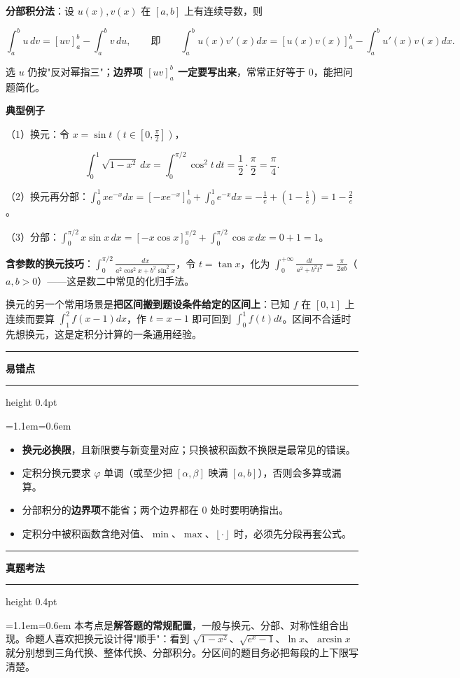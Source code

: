 \documentclass[11pt,openany,UTF8]{ctexbook}
\newcommand{\callouthead}[2]{%
  \par\addvspace{7pt}\noindent
  {\color{#1}\rule[-0.15em]{3pt}{1.05em}}\hspace{0.5em}%
  {\bfseries\color{#1}#2}\par\nobreak\vspace{-0.35em}%
  {\color{rulesep}\hrule height 0.4pt}\nobreak\vspace{0.45em}%
  \begingroup\small\setlength{\parindent}{0pt}%
  \leftskip=1.1em\rightskip=0.6em\noindent\ignorespaces}
\newcommand{\calloutend}{\par\endgroup\addvspace{7pt}}
\newenvironment{callwarn}[1]{\callouthead{warnbar}{#1}}{\calloutend}
\newenvironment{callexam}[1]{\callouthead{exambar}{#1}}{\calloutend}
\begin{document}
\textbf{分部积分法}：设 $u(x),v(x)$ 在 $[a,b]$ 上有连续导数，则

\[\int_a^bu\,dv=\left[uv\right]_a^b-\int_a^bv\,du,\qquad\text{即}\qquad\int_a^bu(x)v'(x)dx=\left[u(x)v(x)\right]_a^b-\int_a^bu'(x)v(x)dx.\]

选 $u$ 仍按"反对幂指三"；\textbf{边界项 $\left[uv\right]_a^b$ 一定要写出来}，常常正好等于 $0$，能把问题简化。

\textbf{典型例子}

（1）换元：令 $x=\sin t\ (t\in[0,\frac{\pi}{2}])$，

\[\int_0^1\sqrt{1-x^2}\,dx=\int_0^{\pi/2}\cos^2t\,dt=\frac{1}{2}\cdot\frac{\pi}{2}=\frac{\pi}{4}.\]

（2）换元再分部：$\displaystyle\int_0^1xe^{-x}dx=\left[-xe^{-x}\right]_0^1+\int_0^1e^{-x}dx=-\frac{1}{e}+\left(1-\frac{1}{e}\right)=1-\frac{2}{e}$。

（3）分部：$\displaystyle\int_0^{\pi/2}x\sin x\,dx=\left[-x\cos x\right]_0^{\pi/2}+\int_0^{\pi/2}\cos x\,dx=0+1=1$。

\textbf{含参数的换元技巧}：$\displaystyle\int_0^{\pi/2}\frac{dx}{a^2\cos^2x+b^2\sin^2x}$，令 $t=\tan x$，化为 $\displaystyle\int_0^{+\infty}\frac{dt}{a^2+b^2t^2}=\frac{\pi}{2ab}$（$a,b>0$）——这是数二中常见的化归手法。

换元的另一个常用场景是\textbf{把区间搬到题设条件给定的区间上}：已知 $f$ 在 $[0,1]$ 上连续而要算 $\int_1^2f(x-1)dx$，作 $t=x-1$ 即可回到 $\int_0^1f(t)dt$。区间不合适时先想换元，这是定积分计算的一条通用经验。

\begin{callwarn}{易错点}
\begin{itemize}
\item \textbf{换元必换限}，且新限要与新变量对应；只换被积函数不换限是最常见的错误。
\item 定积分换元要求 $\varphi$ 单调（或至少把 $[\alpha,\beta]$ 映满 $[a,b]$），否则会多算或漏算。
\item 分部积分的\textbf{边界项}不能省；两个边界都在 $0$ 处时要明确指出。
\item 定积分中被积函数含绝对值、$\min$、$\max$、$\left\lfloor\cdot\right\rfloor$ 时，必须先分段再套公式。
\end{itemize}
\end{callwarn}

\begin{callexam}{真题考法}
本考点是\textbf{解答题的常规配置}，一般与换元、分部、对称性组合出现。命题人喜欢把换元设计得"顺手"：看到 $\sqrt{1-x^2}$、$\sqrt{e^x-1}$、$\ln x$、$\arcsin x$ 就分别想到三角代换、整体代换、分部积分。分区间的题目务必把每段的上下限写清楚。

\end{callexam}
\end{document}
